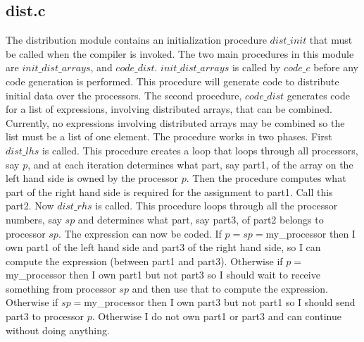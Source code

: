 \subsection{dist.c}
The distribution module contains an initialization procedure $dist\_init$
that must be called when the compiler is invoked.  The two main procedures
in this module are $init\_dist\_arrays$, and $code\_dist$.  
$init\_dist\_arrays$ is called
by $code\_c$ before any code generation is performed.  This procedure will
generate code to distribute initial data over the processors.  The second
procedure, $code\_dist$ generates code for a list of expressions, involving
distributed arrays, that can be combined.  Currently, no expressions involving
distributed arrays may be combined so the list must be a list of one element.
The procedure works in two phases.  First $dist\_lhs$ is called.  This 
procedure
creates a loop that loops through all processors, say $p$, and at each 
iteration determines what part, say part1, of the array on the left hand side 
is
owned by the processor $p$.  Then the procedure computes what part of the right
hand side is required for the assignment to part1.  Call this part2.  Now
$dist\_rhs$ is called.  This procedure loops through all the processor numbers,
say $sp$ and determines what part, say part3, of part2 belongs to processor
$sp$.  The expression can now be coded.  If $p=sp=$my\_processor then
I own part1 of the left hand side and part3 of the right hand side, so I can
compute the expression (between part1 and part3).  Otherwise if 
$p=$my\_processor then I own part1 but 
not part3 so I should wait to receive something from processor $sp$ and then 
use that to compute the expression.  Otherwise if $sp=$my\_processor then
I own part3 but not part1 so I should send part3 to processor $p$.  Otherwise
I do not own part1 or part3 and can continue without doing anything.


